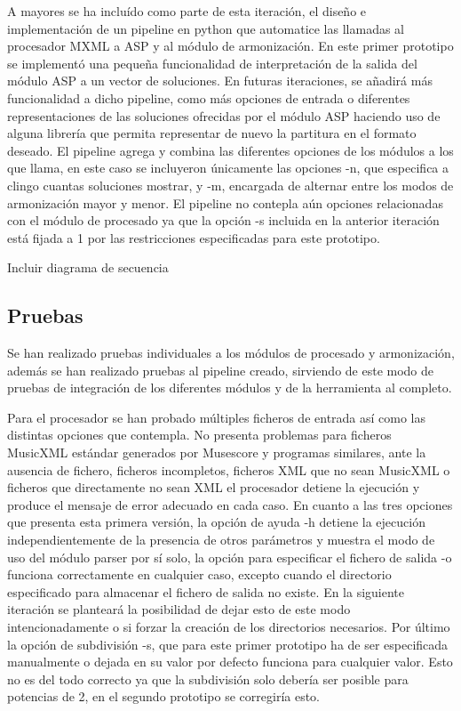 A mayores se ha incluído como parte de esta iteración, el diseño e implementación de un pipeline en python que automatice las llamadas al procesador MXML a ASP y al módulo de armonización. En este primer prototipo se implementó una pequeña funcionalidad de interpretación de la salida del módulo ASP a un vector de soluciones. En futuras iteraciones, se añadirá más funcionalidad a dicho pipeline, como más opciones de entrada o diferentes representaciones de las soluciones ofrecidas por el módulo ASP haciendo uso de alguna librería que permita representar de nuevo la partitura en el formato deseado. El pipeline agrega y combina las diferentes opciones de los módulos a los que llama, en este caso se incluyeron únicamente las opciones -n, que especifica a clingo cuantas soluciones mostrar, y -m, encargada de alternar entre los modos de armonización mayor y menor. El pipeline no contepla aún opciones relacionadas con el módulo de procesado ya que la opción -s incluida en la anterior iteración está fijada a 1 por las restricciones especificadas para este prototipo. 

Incluir diagrama de secuencia \\

\subsection{Pruebas}
Se han realizado pruebas individuales a los módulos de procesado y armonización, además se han realizado pruebas al pipeline creado, sirviendo de este modo de pruebas de integración de los diferentes módulos y de la herramienta al completo.

Para el procesador se han probado múltiples ficheros de entrada así como las distintas opciones que contempla. No presenta problemas para ficheros MusicXML estándar generados por Musescore y programas similares, ante la ausencia de fichero, ficheros incompletos, ficheros XML que no sean MusicXML o ficheros que directamente no sean XML el procesador detiene la ejecución y produce el mensaje de error adecuado en cada caso. En cuanto a las tres opciones que presenta esta primera versión, la opción de ayuda -h detiene la ejecución independientemente de la presencia de otros parámetros y muestra el modo de uso del módulo parser por sí solo, la opción para especificar el fichero de salida -o funciona correctamente en cualquier caso, excepto cuando el directorio especificado para almacenar el fichero de salida no existe. En la siguiente iteración se planteará la posibilidad de dejar esto de este modo intencionadamente o si forzar la creación de los directorios necesarios. Por último la opción de subdivisión -s, que para este primer prototipo ha de ser especificada manualmente o dejada en su valor por defecto funciona para cualquier valor. Esto no es del todo correcto ya que la subdivisión solo debería ser posible para potencias de 2, en el segundo prototipo se corregiría esto.

